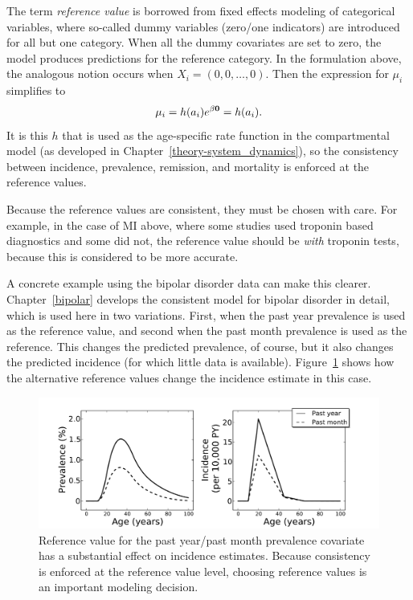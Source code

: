 The term \emph{reference value} is borrowed from fixed effects
modeling of categorical variables, where so-called dummy variables
(zero/one indicators) are introduced for all but one category. When
all the dummy covariates are set to zero, the model produces
predictions for the reference category. In the formulation above, the
analogous notion occurs when $X_i = (0, 0, \ldots, 0)$.  Then the
expression for $\mu_i$ simplifies to
\[
\mu_i = h(a_i) e^{\beta \mathbf{0}} = h(a_i).
\]
It is this $h$ that is used as the age-specific rate function in
the compartmental model (as developed in
Chapter~\ref{theory-system_dynamics}), so the consistency between
incidence, prevalence, remission, and mortality is enforced at the
reference values.

Because the reference values are consistent, they must be chosen with
care.  For example, in the case of MI above, where some studies used
troponin based diagnostics and some did not, the reference value
should be \emph{with} troponin tests, because this is considered to be
more accurate.

A concrete example using the bipolar disorder data can make this
clearer.  Chapter~\ref{bipolar} develops the consistent model for
bipolar disorder in detail, which is used here in two variations.
First, when the past year prevalence is used as the reference
value, and second when the past month prevalence is used as the
reference.  This changes the predicted prevalence, of course, but it
also changes the predicted incidence (for which little data is
available).  Figure~\ref{bipolar-ref-alts} shows how the alternative
reference values change the incidence estimate in this case.


\begin{figure}[h]
\begin{center}
\includegraphics[width=\textwidth]{bipolar-ref-alts.pdf}
\caption{Reference value for the past year/past month prevalence
  covariate has a substantial effect on incidence estimates.  Because
  consistency is enforced at the reference value level, choosing reference
  values is an important modeling decision.}
\label{bipolar-ref-alts}
\end{center}
\end{figure}


